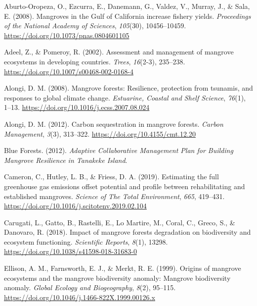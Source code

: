 \documentclass[
  12pt,
]{article}
\newlength{\cslhangindent}
\newlength{\cslentryspacingunit} %
\newenvironment{CSLReferences}[2] %
 {%
  \setlength{\parindent}{0pt}
  \ifodd #1
  \let\oldpar\par
  \def\par{\hangindent=\cslhangindent\oldpar}
  \fi
  \setlength{\parskip}{#2\cslentryspacingunit}
 }%
 {}
\begin{document}
\hypertarget{refs}{}
\begin{CSLReferences}{1}{2}
\leavevmode{}%
Aburto-Oropeza, O., Ezcurra, E., Danemann, G., Valdez, V., Murray, J., \& Sala, E. (2008). Mangroves in the {Gulf} of {California} increase fishery yields. \emph{Proceedings of the National Academy of Sciences}, \emph{105}(30), 10456--10459. \url{https://doi.org/10.1073/pnas.0804601105}

\leavevmode{}%
Adeel, Z., \& Pomeroy, R. (2002). Assessment and management of mangrove ecosystems in developing countries. \emph{Trees}, \emph{16}(2-3), 235--238. \url{https://doi.org/10.1007/s00468-002-0168-4}

\leavevmode{}%
Alongi, D. M. (2008). Mangrove forests: {Resilience}, protection from tsunamis, and responses to global climate change. \emph{Estuarine, Coastal and Shelf Science}, \emph{76}(1), 1--13. \url{https://doi.org/10.1016/j.ecss.2007.08.024}

\leavevmode{}%
Alongi, D. M. (2012). Carbon sequestration in mangrove forests. \emph{Carbon Management}, \emph{3}(3), 313--322. \url{https://doi.org/10.4155/cmt.12.20}

\leavevmode{}%
Blue Forests. (2012). \emph{Adaptive {Collaborative} {Management} {Plan} for {Building} {Mangrove} {Resilience} in {Tanakeke} {Island}}.

\leavevmode{}%
Cameron, C., Hutley, L. B., \& Friess, D. A. (2019). Estimating the full greenhouse gas emissions offset potential and profile between rehabilitating and established mangroves. \emph{Science of The Total Environment}, \emph{665}, 419--431. \url{https://doi.org/10.1016/j.scitotenv.2019.02.104}

\leavevmode{}%
Carugati, L., Gatto, B., Rastelli, E., Lo Martire, M., Coral, C., Greco, S., \& Danovaro, R. (2018). Impact of mangrove forests degradation on biodiversity and ecosystem functioning. \emph{Scientific Reports}, \emph{8}(1), 13298. \url{https://doi.org/10.1038/s41598-018-31683-0}

\leavevmode{}%
Ellison, A. M., Farnsworth, E. J., \& Merkt, R. E. (1999). Origins of mangrove ecosystems and the mangrove biodiversity anomaly: {Mangrove} biodiversity anomaly. \emph{Global Ecology and Biogeography}, \emph{8}(2), 95--115. \url{https://doi.org/10.1046/j.1466-822X.1999.00126.x}


\end{CSLReferences}
\end{document}
